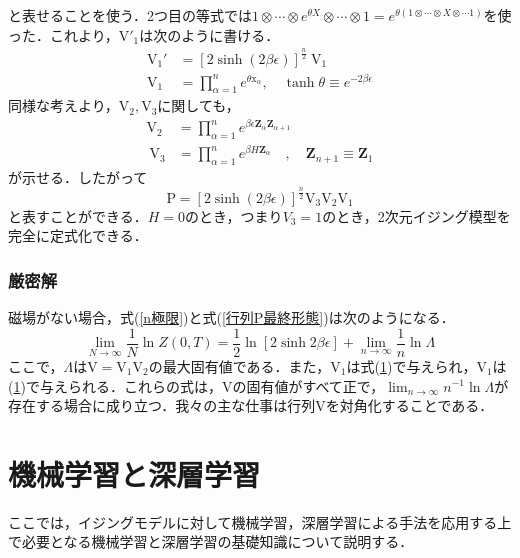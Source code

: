 \documentclass[a4paper,11pt]{jsreport}
\begin{document}
と表せることを使う．2つ目の等式では$1 \otimes \cdots \otimes e^{\theta X} \otimes \cdots \otimes 1 = e^{\theta (1 \otimes \cdots \otimes X \otimes \cdots 1)}$を使った．これより，$\mathrm{V}'_1$は次のように書ける．
\begin{align}
  \mathrm{V}_1'
   & =[2 \sinh (2 \beta \epsilon)]^{\frac{n}{2}} \mathrm{~V}_1                               \\
  \mathrm{V}_1
   & =\prod_{\alpha=1}^n e^{\theta \mathrm{x}_{\alpha}}, \quad \tanh \theta \equiv e^{-2 \beta \epsilon}
\end{align}
同様な考えより，$\mathrm{V}_2, \mathrm{V}_3$に関しても，
\begin{align}
  \mathrm{V}_2
   & =\prod_{\alpha=1}^n e^{\beta \epsilon \mathbf{Z}_\alpha \mathbf{Z}_{\alpha+1}}                      \\
  \mathrm{~V}_3
   & =\prod_{\alpha=1}^n e^{\beta H \mathbf{Z}_\alpha} \quad, \quad \mathbf{Z}_{n+1} \equiv \mathbf{Z}_1
\end{align}
が示せる．したがって
\begin{equation}
  \mathrm{P}
  = [2 \sinh (2 \beta \epsilon)]^{\frac{n}{2}} \mathrm{V}_3 \mathrm{V}_2 \mathrm{V}_1
  \label{行列P最終形態}
\end{equation}
と表すことができる．$H=0$のとき，つまり$V_3 = 1$のとき，2次元イジング模型を完全に定式化できる．

\subsection{厳密解}
磁場がない場合，式(\ref{n極限})と式(\ref{行列P最終形態})は次のようになる．
\begin{equation}
  \lim_{N \rightarrow \infty} \frac{1}{N} \ln{Z(0, T)} 
  = \frac{1}{2} \ln{[2 \sinh{2 \beta \epsilon}]}
  + \lim_{n \rightarrow \infty} \frac{1}{n} \ln{\Lambda}
\end{equation}
ここで，$\Lambda$は$\mathrm{V} = \mathrm{V}_1 \mathrm{V}_2$の最大固有値である．また，$\mathrm{V}_1$は式(\ref{})で与えられ，$\mathrm{V}_1$は(\ref{})で与えられる．これらの式は，Vの固有値がすべて正で，$\lim_{n \rightarrow \infty} n^{-1}\ln{\Lambda}$が存在する場合に成り立つ．我々の主な仕事は行列$\mathrm{V}$を対角化することである．


\chapter{機械学習と深層学習}
ここでは，イジングモデルに対して機械学習，深層学習による手法を応用する上で必要となる機械学習と深層学習の基礎知識について説明する．
\end{document}
